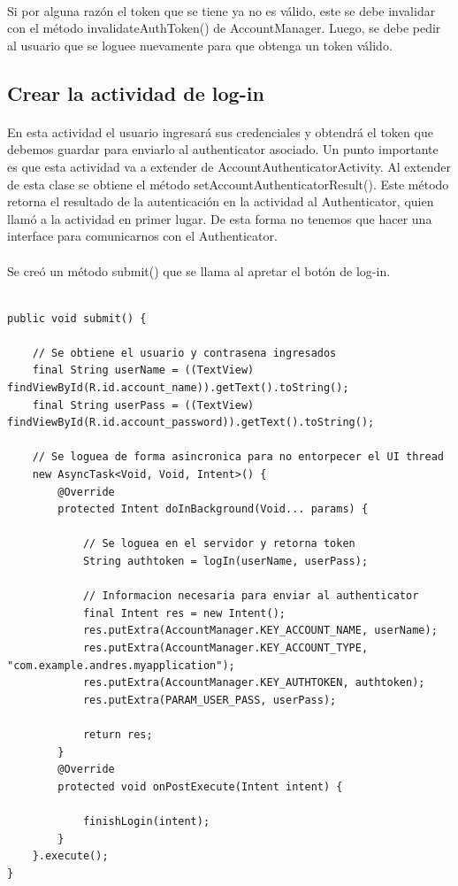 \documentclass[10pt]{extarticle}
\begin{document}
\paragraph{}
Si por alguna razón el token que se tiene ya no es válido, este se debe invalidar con el método invalidateAuthToken() de AccountManager. Luego, se debe pedir al usuario que se loguee nuevamente para que obtenga un token válido.

\subsection{Crear la actividad de log-in}

\paragraph{}
En esta actividad el usuario ingresará sus credenciales y obtendrá el token que debemos guardar para enviarlo al authenticator asociado. Un punto importante es que esta actividad va a extender de AccountAuthenticatorActivity. Al extender de esta clase se obtiene el método setAccountAuthenticatorResult(). Este método retorna el resultado de la autenticación en la actividad al Authenticator, quien llamó a la actividad en primer lugar. De esta forma no tenemos que hacer una interface para comunicarnos con el Authenticator.

\paragraph{}
Se creó un método submit() que se llama al apretar el botón de log-in.

\begin{lstlisting}

public void submit() {

    // Se obtiene el usuario y contrasena ingresados
    final String userName = ((TextView) findViewById(R.id.account_name)).getText().toString();
    final String userPass = ((TextView) findViewById(R.id.account_password)).getText().toString();

    // Se loguea de forma asincronica para no entorpecer el UI thread
    new AsyncTask<Void, Void, Intent>() {
        @Override
        protected Intent doInBackground(Void... params) {

            // Se loguea en el servidor y retorna token
            String authtoken = logIn(userName, userPass);

            // Informacion necesaria para enviar al authenticator
            final Intent res = new Intent();
            res.putExtra(AccountManager.KEY_ACCOUNT_NAME, userName);
            res.putExtra(AccountManager.KEY_ACCOUNT_TYPE, "com.example.andres.myapplication");
            res.putExtra(AccountManager.KEY_AUTHTOKEN, authtoken);
            res.putExtra(PARAM_USER_PASS, userPass);

            return res;
        }
        @Override
        protected void onPostExecute(Intent intent) {
            
            finishLogin(intent);
        }
    }.execute();
}

\end{lstlisting}
\end{document}
